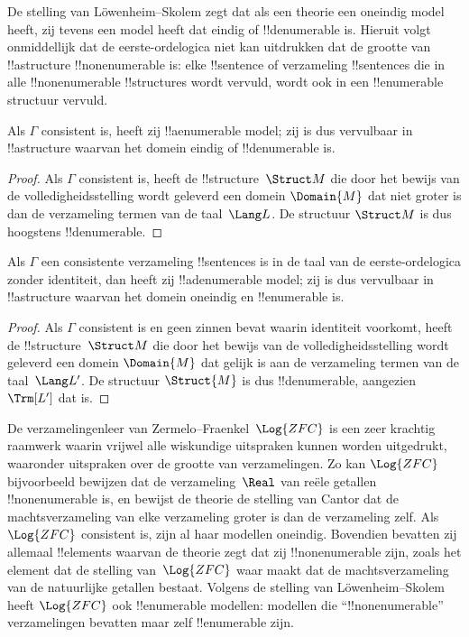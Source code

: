 \documentclass[../../../include/open-logic-section]{subfiles}
\begin{document}

De stelling van L\"owenheim--Skolem zegt dat als een theorie een oneindig
model heeft, zij tevens een model heeft dat eindig of !!{denumerable} is.
Hieruit volgt onmiddellijk dat de eerste-ordelogica niet kan uitdrukken
dat de grootte van !!a{structure} !!{nonenumerable} is: elke !!{sentence}
of verzameling !!{sentence}s die in alle !!{nonenumerable} !!{structure}s
wordt vervuld, wordt ook in een !!{enumerable} structuur vervuld.

\begin{thm} 
 Als $\Gamma$ consistent is, heeft zij
!!a{enumerable} model; zij is dus vervulbaar in !!a{structure}
waarvan het domein eindig of !!{denumerable} is.
\end{thm}

\begin{proof}
Als $\Gamma$ consistent is, heeft de !!{structure}~$\Struct M$ die door
het bewijs van de volledigheidsstelling wordt geleverd een domein
$\Domain{M}$ dat niet groter is dan de verzameling termen van de
taal~$\Lang L$. De structuur $\Struct M$ is dus hoogstens
!!{denumerable}.
\end{proof}

\begin{thm}
 Als $\Gamma$ een consistente verzameling
!!{sentence}s is in de taal van de eerste-ordelogica zonder identiteit,
dan heeft zij !!a{denumerable} model; zij is dus vervulbaar in
!!a{structure} waarvan het domein oneindig en !!{enumerable} is.
\end{thm}

\begin{proof}
Als $\Gamma$ consistent is en geen zinnen bevat waarin identiteit
voorkomt, heeft de !!{structure}~$\Struct M$ die door het bewijs van de
volledigheidsstelling wordt geleverd een domein $\Domain{M}$ dat gelijk
is aan de verzameling termen van de taal~$\Lang L'$. De structuur
$\Struct{M}$ is dus !!{denumerable}, aangezien $\Trm[L']$ dat is.
\end{proof}

\begin{ex}
De verzamelingenleer van Zermelo--Fraenkel~$\Log{ZFC}$ is een zeer
krachtig raamwerk waarin vrijwel alle wiskundige uitspraken kunnen
worden uitgedrukt, waaronder uitspraken over de grootte van
verzamelingen. Zo kan $\Log{ZFC}$ bijvoorbeeld bewijzen dat de
verzameling~$\Real$ van reële getallen !!{nonenumerable} is, en bewijst
de theorie de stelling van Cantor dat de machtsverzameling van elke
verzameling groter is dan de verzameling zelf. Als $\Log{ZFC}$
consistent is, zijn al haar modellen oneindig. Bovendien bevatten zij
allemaal !!{element}s waarvan de theorie zegt dat zij !!{nonenumerable}
zijn, zoals het element dat de stelling van~$\Log{ZFC}$ waar maakt dat de
machtsverzameling van de natuurlijke getallen bestaat. Volgens de
stelling van L\"owenheim--Skolem heeft $\Log{ZFC}$ ook !!{enumerable}
modellen: modellen die ``!!{nonenumerable}'' verzamelingen bevatten maar
zelf !!{enumerable} zijn.
\end{ex}
\end{document}
